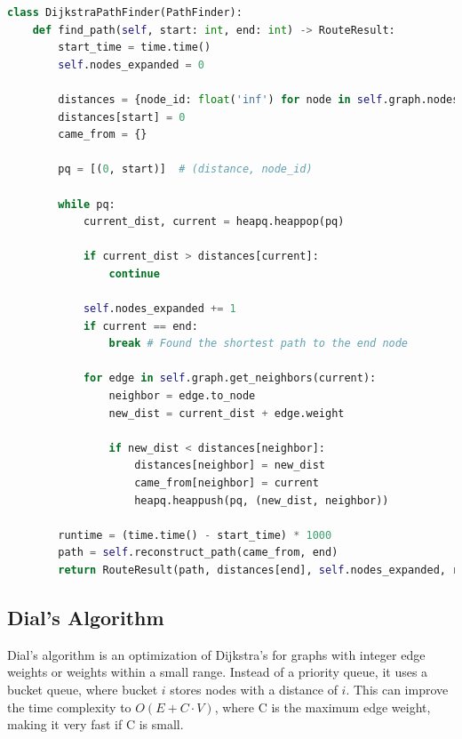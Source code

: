 \documentclass[12pt, a4paper]{report}
\begin{document}
\begin{lstlisting}[language=Python, caption={Code Snippet: `DijkstraPathFinder' from `algorithms.py'}, label={lst:dijkstra}]
class DijkstraPathFinder(PathFinder):
    def find_path(self, start: int, end: int) -> RouteResult:
        start_time = time.time()
        self.nodes_expanded = 0
        
        distances = {node_id: float('inf') for node in self.graph.nodes}
        distances[start] = 0
        came_from = {}
        
        pq = [(0, start)]  # (distance, node_id)
        
        while pq:
            current_dist, current = heapq.heappop(pq)
            
            if current_dist > distances[current]:
                continue
            
            self.nodes_expanded += 1
            if current == end:
                break # Found the shortest path to the end node
            
            for edge in self.graph.get_neighbors(current):
                neighbor = edge.to_node
                new_dist = current_dist + edge.weight
                
                if new_dist < distances[neighbor]:
                    distances[neighbor] = new_dist
                    came_from[neighbor] = current
                    heapq.heappush(pq, (new_dist, neighbor))
        
        runtime = (time.time() - start_time) * 1000
        path = self.reconstruct_path(came_from, end)
        return RouteResult(path, distances[end], self.nodes_expanded, runtime, 'dijkstra')
\end{lstlisting}

\subsection{Dial's Algorithm}
Dial's algorithm is an optimization of Dijkstra's for graphs with integer edge weights or weights within a small range. Instead of a priority queue, it uses a bucket queue, where bucket $i$ stores nodes with a distance of $i$. This can improve the time complexity to $O(E + C \cdot V)$, where C is the maximum edge weight, making it very fast if C is small.
\end{document}
